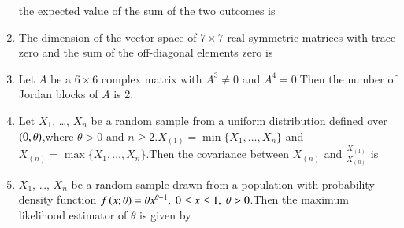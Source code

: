 \documentclass[journal]{IEEEtran}
\begin{document}
\begin{enumerate}
the expected value of the sum of the two outcomes is
\begin{enumerate}
\end{enumerate}
\item The dimension of the vector space of $7 \times 7$ real symmetric matrices with trace zero and the sum of the off-diagonal elements zero is 
\begin{enumerate}
\end{enumerate}
\item Let $A$ be a $6 \times 6$ complex matrix with $A^3 \neq 0$ and $A^4 = 0$.Then the number of Jordan blocks of $A$ is 2.
\begin{enumerate}
\end{enumerate}
\item Let $X_1$, \ldots, $X_n$ be a random sample from a uniform distribution defined over $\left(0, \theta\right)$,where $\theta > 0$ and $n \geq 2$.$X_{(1)} = \min\{X_1, \ldots, X_n\}$ and $X_{(n)} = \max\{X_1, \ldots, X_n\}$.Then the covariance between $X_{(n)}$ and $\frac{X_{(1)}}{X_{(n)}}$ is
\begin{enumerate}
\end{enumerate}
\item $X_1$, \ldots, $X_n$ be a random sample drawn from a population with probability density function $f\left(x; \theta\right) = \theta x^{\theta - 1}, \; 0 \leq x \leq 1, \; \theta > 0$.Then the maximum likelihood estimator of $\theta$ is given by 

\end{enumerate}
\end{document}
